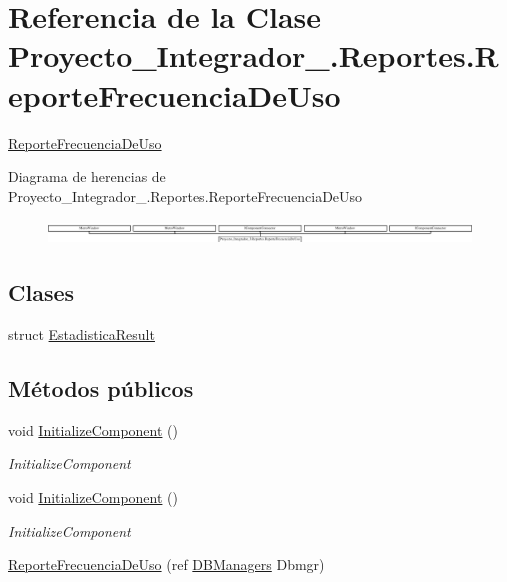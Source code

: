 \hypertarget{class_proyecto___integrador__3_1_1_reportes_1_1_reporte_frecuencia_de_uso}{\section{Referencia de la Clase Proyecto\-\_\-\-Integrador\-\_.\-Reportes.\-Reporte\-Frecuencia\-De\-Uso}
\label{class_proyecto___integrador__3_1_1_reportes_1_1_reporte_frecuencia_de_uso}
}


\hyperlink{class_proyecto___integrador__3_1_1_reportes_1_1_reporte_frecuencia_de_uso}{Reporte\-Frecuencia\-De\-Uso}  


Diagrama de herencias de Proyecto\-\_\-\-Integrador\-\_.\-Reportes.\-Reporte\-Frecuencia\-De\-Uso\begin{figure}[H]
\begin{center}
\leavevmode
\includegraphics[height=0.632768cm]{class_proyecto___integrador__3_1_1_reportes_1_1_reporte_frecuencia_de_uso}
\end{center}
\end{figure}
\subsection*{Clases}
\begin{DoxyCompactItemize}
\item 
struct \hyperlink{struct_proyecto___integrador__3_1_1_reportes_1_1_reporte_frecuencia_de_uso_1_1_estadistica_result}{Estadistica\-Result}
\end{DoxyCompactItemize}
\subsection*{Métodos públicos}
\begin{DoxyCompactItemize}
\item 
void \hyperlink{class_proyecto___integrador__3_1_1_reportes_1_1_reporte_frecuencia_de_uso_ab0c2c9d5584ade92aa8142d2299bfe06}{Initialize\-Component} ()
\begin{DoxyCompactList}\small\item\em Initialize\-Component \end{DoxyCompactList}\item 
void \hyperlink{class_proyecto___integrador__3_1_1_reportes_1_1_reporte_frecuencia_de_uso_ab0c2c9d5584ade92aa8142d2299bfe06}{Initialize\-Component} ()
\begin{DoxyCompactList}\small\item\em Initialize\-Component \end{DoxyCompactList}\item 
\hyperlink{class_proyecto___integrador__3_1_1_reportes_1_1_reporte_frecuencia_de_uso_a6150054e9ff15f176a07d74d892c19a5}{Reporte\-Frecuencia\-De\-Uso} (ref \hyperlink{class_proyecto___integrador__3_1_1_d_b_managers}{D\-B\-Managers} Dbmgr)
\end{DoxyCompactItemize}

